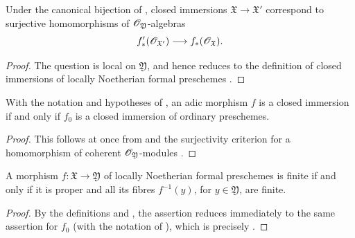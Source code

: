\begin{corollary}[4.8.9]
\label{III.4.8.9}
Under the canonical bijection of , closed
immersions $\mathfrak{X}\to\mathfrak{X}'$ correspond to
surjective homomorphisms of $\mathscr{O}_{\mathfrak{Y}}$-algebras
\[
  f'_*(\mathscr{O}_{\mathfrak{X}'})
  \longrightarrow
  f_*(\mathscr{O}_{\mathfrak{X}}).
\]
\end{corollary}

\begin{proof}
The question is local on $\mathfrak{Y}$, and hence reduces to the
definition of closed immersions of locally Noetherian formal
preschemes .
\end{proof}

\begin{corollary}[4.8.10]
\label{III.4.8.10}
With the notation and hypotheses of , an adic
morphism $f$ is a closed immersion if and only if $f_0$ is a
closed immersion of ordinary preschemes.
\end{corollary}

\begin{proof}
This follows at once from  and the surjectivity
criterion for a homomorphism of coherent
$\mathscr{O}_{\mathfrak{Y}}$-modules .
\end{proof}

\begin{proposition}[4.8.11]
\label{III.4.8.11}
A morphism $f:\mathfrak{X}\to\mathfrak{Y}$ of locally Noetherian
formal preschemes
is finite if and only if it is proper and all its fibres
$f^{-1}(y)$, for $y\in\mathfrak{Y}$, are finite.
\end{proposition}

\begin{proof}
By the definitions  and , the
assertion reduces immediately to the same assertion for $f_0$
(with the notation of ), which is precisely
.
\end{proof}
